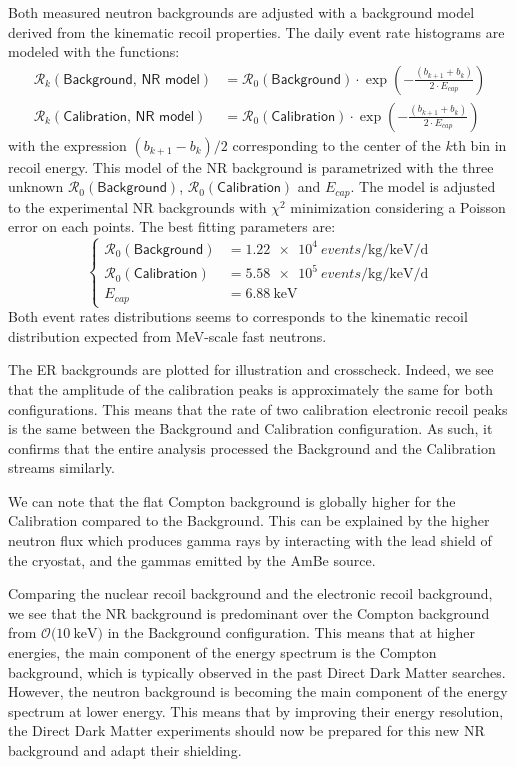 Both measured neutron backgrounds are adjusted with a background model derived from the kinematic recoil properties. The daily event rate histograms are modeled with the functions:
\begin{align}
\mathcal{R}_k(\textsf{Background, NR model}) &= \mathcal{R}_0(\textsf{Background}) \cdot \exp
 \left( - \frac{ (b_{k+1} + b_{k}) }{2 \cdot E_{cap}} \right)
 \\
\mathcal{R}_k(\textsf{Calibration, NR model}) &= \mathcal{R}_0(\textsf{Calibration}) \cdot \exp 
 \left( - \frac{ (b_{k+1} + b_{k}) }{2 \cdot E_{cap}} \right)
\end{align}
with the expression $(b_{k+1} - b_{k})/2$ corresponding to the center of the $k$th bin in recoil energy. This model of the NR background is parametrized with the three unknown $\mathcal{R}_0(\textsf{Background})$, $\mathcal{R}_0(\textsf{Calibration})$ and $E_{cap}$. The model is adjusted to the experimental NR backgrounds with $\chi^2$ minimization considering a Poisson error on each points. The best fitting parameters are:
\begin{equation}
\begin{cases}
\mathcal{R}_0(\textsf{Background}) &= \SI{1.22e4}{events \per \kg \per \kilo\eV \per \day}
\\
\mathcal{R}_0(\textsf{Calibration}) &= \SI{5.58e5}{events \per \kg \per \kilo\eV \per \day}
\\
E_{cap} &= \SI{6.88}{\kilo\eV}
\end{cases}
\end{equation} 
Both event rates distributions seems to corresponds to the kinematic recoil distribution expected from \si{\mega\eV}-scale fast neutrons.


The ER backgrounds are plotted for illustration and crosscheck. Indeed, we see that the amplitude of the calibration peaks is approximately the same for both configurations. This means that the rate of two calibration electronic recoil peaks is the same between the Background and Calibration configuration. As such, it confirms that the entire analysis processed the Background and the Calibration streams similarly. 

We can note that the flat Compton background is globally higher for the Calibration compared to the Background. This can be explained by the higher neutron flux which produces gamma rays by interacting with the lead shield of the cryostat, and the gammas emitted by the AmBe source.

Comparing the nuclear recoil background and the electronic recoil background, we see that the NR background is predominant over the Compton background from $\mathcal{O}(\SI{10}{\kilo\eV)}$ in the Background configuration. This means that at higher energies, the main component of the energy spectrum is the Compton background, which is typically observed in the past Direct Dark Matter searches. However, the neutron background is becoming the main component of the energy spectrum at lower energy. This means that by improving their energy resolution, the Direct Dark Matter experiments should now be prepared for this new NR background and adapt their shielding. 


